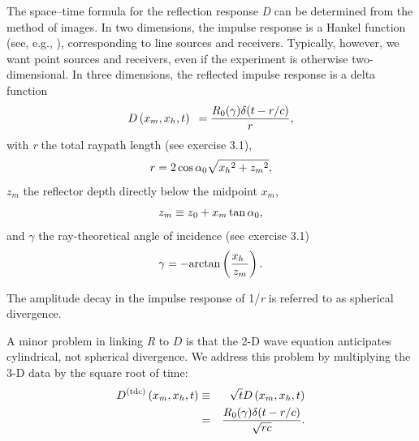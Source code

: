 The space--time formula for the reflection response \textit{D} can be determined from the method of images. In two dimensions, the impulse response
is a Hankel function (see, e.g., \cite{tufte_1997}), corresponding to line sources and receivers. Typically, however, we want point sources
and receivers, even if the experiment is otherwise two-dimensional. In three dimensions, the reflected impulse response is a delta function
\begin{equation}\text{\textit{$D$}}\left(\text{\textit{$x_m$}},\text{\textit{$x_h$}},\text{\textit{$t$}}\right)\text{  }= \frac{\text{\textit{$R$}}_0(\gamma
) \delta (\text{\textit{$t$}}-\text{\textit{$r$}}/\text{\textit{$c$}})}{\text{\textit{$r$}}},\end{equation}
with \textit{r} the total raypath length (see exercise 3.1),
\begin{equation}\text{\textit{$r$}}= 2\cos  \alpha _0\sqrt{\text{\textit{$x_h$}}{}^2+\text{\textit{$z_m$}}{}^2},\end{equation}
\(z_m\) the reflector depth directly below the midpoint \(x_m\),
\begin{equation}\text{\textit{$z_m$}}\equiv \text{\textit{$z$}}_0+\text{\textit{$x_m$}}\text{\textit{$ $}}\tan  \alpha _0,\end{equation}
and $\gamma $ the ray-theoretical angle of incidence (see exercise 3.1)
\begin{equation} \gamma =-\text{arctan}\left(\frac{\text{\textit{$x_h$}}\text{  }}{\text{\textit{$z_m$}}}\right).\end{equation}

The amplitude decay in the impulse response of 1/\textit{r} is referred to as spherical divergence.

A minor problem in linking \textit{R} to \(D\) is that the 2-D wave equation anticipates cylindrical, not spherical divergence. We
address this problem by multiplying the 3-D data by the square root of time:
\begin{eqnarray}\text{\textit{$D$}}^{(\text{{tdc}})}\left(\text{\textit{$x_m$}},\text{\textit{$x_h$}},
\text{\textit{$t$}}\right) & \equiv &
\sqrt{\text{\textit{$t$}}}\text{\textit{$D$}}\left(\text{\textit{$x_m$}},\text{\textit{$x_h$}},\text{\textit{$t$}}\right)\nonumber\\
& = &  \frac{\text{\textit{$R$}}_0(\gamma
) \delta (\text{\textit{$t$}}-\text{\textit{$r$}}/\text{\textit{$c$}})}{\sqrt{\text{\textit{$r c$}}}}.\end{eqnarray}

